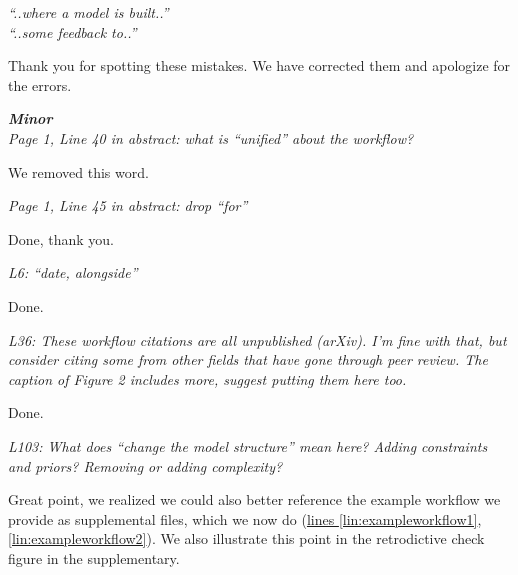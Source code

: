 \documentclass[11pt,letter]{article}
\begin{document}
\begin{mybox}
\emph{“..where a model is built..”\\
“..some feedback to..”}
\end{mybox}

Thank you for spotting these mistakes. We have corrected them and apologize for the errors. 

\begin{mybox}
\emph{\textbf{Minor}\\
Page 1, Line 40 in abstract: what is “unified” about the workflow?}
\end{mybox}

We removed this word.

\begin{mybox}
\emph{Page 1, Line 45 in abstract: drop “for”}
\end{mybox}

Done, thank you.

\begin{mybox}
\emph{L6: “date, alongside”}
\end{mybox}

Done.

\begin{mybox}
\emph{L36: These workflow citations are all unpublished (arXiv). I’m fine with that, but consider citing some from other fields that have gone through peer review. The caption of Figure 2 includes more, suggest putting them here too.}
\end{mybox}

Done.

\begin{mybox}
\emph{L103: What does “change the model structure” mean here? Adding constraints and priors? Removing or adding complexity?}
\end{mybox}

Great point, we realized we could also better reference the example workflow we provide as supplemental files, which we now do (\href{file:forecastflows_r1\#lintarget:exampleworkflow1}{lines \ref*{lin:exampleworkflow1}}, \href{file:forecastflows_r1\#lintarget:exampleworkflow2}{\ref*{lin:exampleworkflow2}}). We also illustrate this point in the retrodictive check figure in the supplementary.
\end{document}
